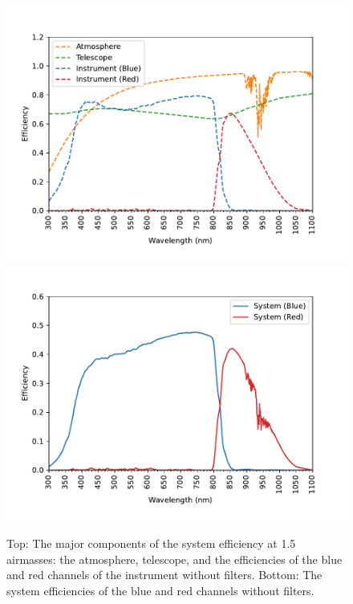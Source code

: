 \begin{figure}
\centering
\includegraphics[width=0.80\linewidth]{figure/components.pdf}
\includegraphics[width=0.80\linewidth]{figure/system.pdf}
\caption{Top: The major components of the system efficiency at 1.5 airmasses: the atmosphere, telescope, and the efficiencies of the blue and red channels of the instrument without filters. Bottom: The system efficiencies of the blue and red channels without filters.}
\label{figure:system-efficiency}
\end{figure}

